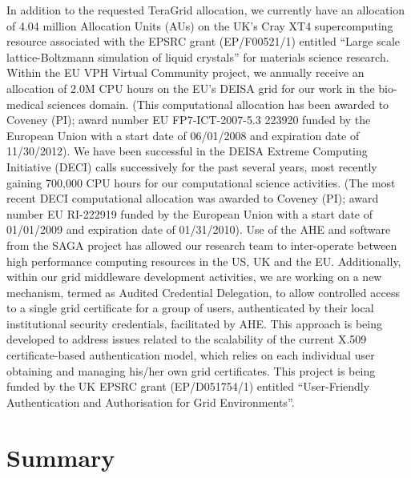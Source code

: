 \documentclass[a4paper,10pt]{article}
\begin{document}
In addition to the requested TeraGrid allocation, we currently have an allocation of 4.04 million Allocation Units (AUs) on the UK's Cray XT4 supercomputing resource associated with the EPSRC grant (EP/F00521/1) entitled ``Large scale lattice-Boltzmann simulation of liquid crystals'' for materials science research. Within the EU VPH Virtual Community project, we annually receive an allocation of 2.0M CPU hours on the EU's DEISA grid for our work in the bio-medical sciences domain.  (This computational allocation has been awarded to Coveney (PI); award number EU FP7-ICT-2007-5.3 223920 funded by the European Union with a start date of 06/01/2008 and expiration date of 11/30/2012).  We have been successful in the DEISA Extreme Computing Initiative (DECI) calls successively for the past several years, most recently gaining 700,000 CPU hours for our computational science activities.  (The most recent DECI computational allocation was awarded to Coveney (PI); award number EU RI-222919 funded by the European Union with a start date of 01/01/2009 and expiration date of 01/31/2010).  Use of the AHE and software from the SAGA project has allowed our research team to inter-operate between high performance computing resources in the US, UK and the EU.  Additionally, within our grid middleware development activities, we are working on
a new mechanism, termed as Audited Credential Delegation, to allow controlled access to a single grid certificate for a group of users, authenticated by their local institutional security credentials, facilitated by AHE. This approach is being developed to address issues related to the scalability of the current X.509 certificate-based authentication model, which relies on each individual user obtaining and managing his/her own grid certificates. This project is being funded by the UK EPSRC grant (EP/D051754/1) entitled ``User-Friendly Authentication and Authorisation for Grid Environments''.

\section*{Summary}
\end{document}
